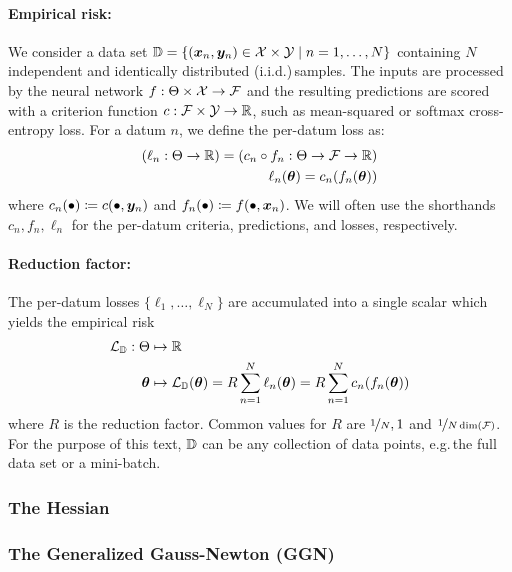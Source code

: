 \paragraph{Empirical risk:} We consider a data set ${\mathbb{D}} = \{({\bm{x}}_n, {\bm{y}}_n) \in {\mathcal{X}} \times {\mathcal{Y}} \mid n = 1, \dots, N \}$ containing $N$ independent and identically distributed (i.i.d.)\,samples.
The inputs are processed by the neural network $f: \Theta \times {\mathcal{X}} \to {\mathcal{F}}$ and the resulting predictions are scored with a criterion function $c: {\mathcal{F}} \times {\mathcal{Y}} \to {\mathbb{R}}$, such as mean-squared or softmax cross-entropy loss.
For a datum $n$, we define the per-datum loss as:
\begin{align*}
  (\ell_n: \Theta \to {\mathbb{R}}) = (c_n \circ f_n: \Theta \to {\mathcal{F}} \to {\mathbb{R}})
  \\
  \ell_n({\bm{\theta}}) = c_n(f_n({\bm{\theta}}))
\end{align*}
where $c_n(\bullet) \coloneq c(\bullet, {\bm{y}}_n)$ and $f_n(\bullet) \coloneq f(\bullet, {\bm{x}}_n)$.
We will often use the shorthands $c_n, f_n, \ell_n$ for the per-datum criteria, predictions, and losses, respectively.

\paragraph{Reduction factor:} The per-datum losses $\{\ell_1, \dots, \ell_N\}$ are accumulated into a single scalar which yields the empirical risk
\begin{align*}
  {\mathcal{L}}_{{\mathbb{D}}}: \Theta & \mapsto {\mathbb{R}}
  \\
  {\bm{\theta}}           & \mapsto {\mathcal{L}}_{{\mathbb{D}}}({\bm{\theta}}) = R \sum_{n=1}^N \ell_n({\bm{\theta}}) = R \sum_{n=1}^N c_n(f_n({\bm{\theta}}))
\end{align*}
where $R$ is the reduction factor. Common values for $R$ are $\nicefrac{1}{N}, 1$ and $\nicefrac{1}{N \dim({\mathcal{F}})}$.
For the purpose of this text, ${\mathbb{D}}$ can be any collection of data points, e.g.\,the full data set or a mini-batch.

\subsubsection{The Hessian}\label{sec:basics_dl_hessian}


\subsubsection{The Generalized Gauss-Newton (GGN)}


